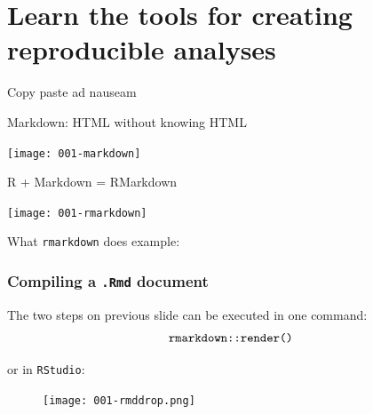 \documentclass{beamer}\usepackage[]{graphicx}\usepackage[]{color}
\begin{document}
\section{Learn the tools for creating reproducible analyses}


\begin{frame}{Copy paste ad nauseam}
\end{frame}


\begin{frame}{Markdown: HTML without knowing HTML}
	\begin{center}
		\texttt{[image: 001-markdown]}
	\end{center}
\end{frame}

\begin{frame}{R + Markdown = RMarkdown}
	\begin{center}
		\texttt{[image: 001-rmarkdown]}
	\end{center}
\end{frame}

\begin{frame}{What \texttt{rmarkdown} does}
	\textbf{} example:
	
	\begin{center}
	\end{center}
\end{frame}


\begin{frame}\frametitle{Compiling a \texttt{.Rmd} document}
	
	\begin{block}{The two steps on previous slide can be executed in one command:}
		\[ \textrm{\texttt{rmarkdown::render()}} \]
	\end{block}
	
	or in \texttt{RStudio}:
	\begin{figure}[h!]
		\centering
		\texttt{[image: 001-rmddrop.png]}
	\end{figure}
\end{frame}
\end{document}
